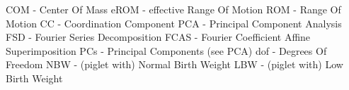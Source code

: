 COM - Center Of Mass
eROM - effective Range Of Motion
ROM - Range Of Motion
CC - Coordination Component
PCA - Principal Component Analysis
FSD - Fourier Series Decomposition
FCAS - Fourier Coefficient Affine Superimposition
PCs - Principal Components (see PCA)
dof - Degrees Of Freedom
NBW - (piglet with) Normal Birth Weight
LBW - (piglet with) Low Birth Weight
